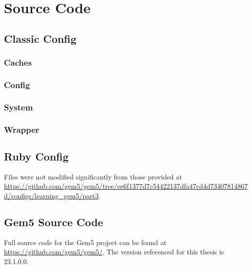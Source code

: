 \documentclass[12pt,twoside]{reedthesis}
\newcommand{\vstep}{\vspace{5mm}}
\begin{document}
\appendix

\chapter{Source Code}

\section{Classic Config}

\subsection*{Caches}

\vstep

\subsection*{Config}

\vstep

\subsection*{System}

\vstep

\subsection*{Wrapper}

\vstep

\section{Ruby Config}

Files were not modified significantly from those provided at \url{https://github.com/gem5/gem5/tree/ee6f1377d7c54422137dfa47cd4d73407814867d/configs/learning_gem5/part3}.

\section{Gem5 Source Code}

Full source code for the Gem5 project can be found at \url{https://github.com/gem5/gem5/}. The version referenced for this thesis is 23.1.0.0.

\nocite{*}
\printbibliography[title=References]
\end{document}

